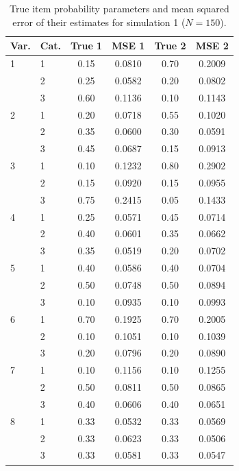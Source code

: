 \begin{table}[H]
\centering
\begin{tabular}{llcccc}
  \toprule
\textbf{Var.} & \textbf{Cat.} & \textbf{True 1} & \textbf{MSE 1} & \textbf{True 2} & \textbf{MSE 2} \\ 
  \midrule
1 & 1 & 0.15 & 0.0810 & 0.70 & 0.2009 \\ 
   & 2 & 0.25 & 0.0582 & 0.20 & 0.0802 \\ 
   & 3 & 0.60 & 0.1136 & 0.10 & 0.1143 \\ 
  2 & 1 & 0.20 & 0.0718 & 0.55 & 0.1020 \\ 
   & 2 & 0.35 & 0.0600 & 0.30 & 0.0591 \\ 
   & 3 & 0.45 & 0.0687 & 0.15 & 0.0913 \\ 
  3 & 1 & 0.10 & 0.1232 & 0.80 & 0.2902 \\ 
   & 2 & 0.15 & 0.0920 & 0.15 & 0.0955 \\ 
   & 3 & 0.75 & 0.2415 & 0.05 & 0.1433 \\ 
  4 & 1 & 0.25 & 0.0571 & 0.45 & 0.0714 \\ 
   & 2 & 0.40 & 0.0601 & 0.35 & 0.0662 \\ 
   & 3 & 0.35 & 0.0519 & 0.20 & 0.0702 \\ 
  5 & 1 & 0.40 & 0.0586 & 0.40 & 0.0704 \\ 
   & 2 & 0.50 & 0.0748 & 0.50 & 0.0894 \\ 
   & 3 & 0.10 & 0.0935 & 0.10 & 0.0993 \\ 
  6 & 1 & 0.70 & 0.1925 & 0.70 & 0.2005 \\ 
   & 2 & 0.10 & 0.1051 & 0.10 & 0.1039 \\ 
   & 3 & 0.20 & 0.0796 & 0.20 & 0.0890 \\ 
  7 & 1 & 0.10 & 0.1156 & 0.10 & 0.1255 \\ 
   & 2 & 0.50 & 0.0811 & 0.50 & 0.0865 \\ 
   & 3 & 0.40 & 0.0606 & 0.40 & 0.0651 \\ 
  8 & 1 & 0.33 & 0.0532 & 0.33 & 0.0569 \\ 
   & 2 & 0.33 & 0.0623 & 0.33 & 0.0506 \\ 
   & 3 & 0.33 & 0.0581 & 0.33 & 0.0547 \\ 
   \bottomrule
\end{tabular}
\caption{True item probability parameters and mean squared error of their estimates for simulation 1 ($N = 150$).} 
\label{table:sim1_item_prob_mse_N150}
\end{table}
